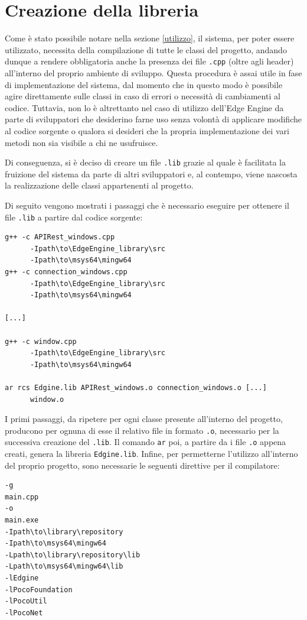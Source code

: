 \section{Creazione della libreria}
Come è stato possibile notare nella sezione \ref{utilizzo}, il sistema, per poter essere utilizzato, necessita della compilazione di tutte le classi del progetto, andando dunque a rendere obbligatoria anche la presenza dei file \texttt{.cpp} (oltre agli header) all'interno del proprio ambiente di sviluppo. Questa procedura è assai utile in fase di implementazione del sistema, dal momento che in questo modo è possibile agire direttamente sulle classi in caso di errori o necessità di cambiamenti al codice. Tuttavia, non lo è altrettanto nel caso di utilizzo dell'Edge Engine da parte di sviluppatori che desiderino farne uso senza volontà di applicare modifiche al codice sorgente o qualora si desideri che la propria implementazione dei vari metodi non sia visibile a chi ne usufruisce.

Di conseguenza, si è deciso di creare un file \texttt{.lib} grazie al quale è facilitata la fruizione del sistema da parte di altri sviluppatori e, al contempo, viene nascosta la realizzazione delle classi appartenenti al progetto.

Di seguito vengono mostrati i passaggi che è necessario eseguire per ottenere il file \texttt{.lib} a partire dal codice sorgente:

\begin{verbatim}
g++ -c APIRest_windows.cpp 
      -Ipath\to\EdgeEngine_library\src 
      -Ipath\to\msys64\mingw64 
g++ -c connection_windows.cpp 
      -Ipath\to\EdgeEngine_library\src 
      -Ipath\to\msys64\mingw64 

[...]

g++ -c window.cpp
      -Ipath\to\EdgeEngine_library\src 
      -Ipath\to\msys64\mingw64 
 
ar rcs Edgine.lib APIRest_windows.o connection_windows.o [...] 
      window.o
\end{verbatim}

I primi passaggi, da ripetere per ogni classe presente all'interno del progetto, producono per ognuna di esse il relativo file in formato \texttt{.o}, necessario per la successiva creazione del \texttt{.lib}. Il comando \texttt{ar} poi, a partire da i file \texttt{.o} appena creati, genera la libreria \texttt{Edgine.lib}. Infine, per permetterne l'utilizzo all'interno del proprio progetto, sono necessarie le seguenti direttive per il compilatore:

\begin{verbatim}
-g
main.cpp
-o
main.exe
-Ipath\to\library\repository
-Ipath\to\msys64\mingw64
-Lpath\to\library\repository\lib
-Lpath\to\msys64\mingw64\lib
-lEdgine
-lPocoFoundation
-lPocoUtil
-lPocoNet
\end{verbatim}








